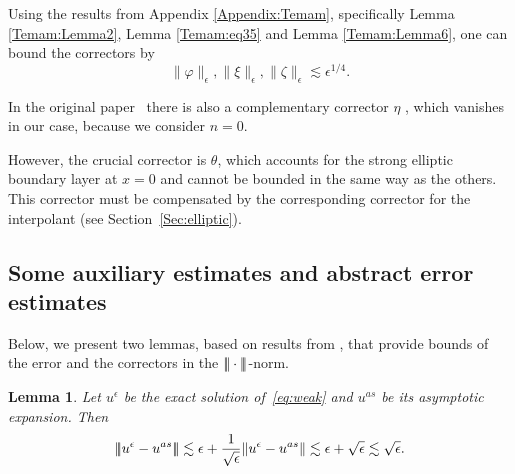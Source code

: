\documentclass{article}
\newcommand{\vvvert}{\ensuremath|\!|\!|\xspace}
\newtheorem{lemma}[thm]{Lemma}
\newcommand{\ueps}{u^\epsilon}
\newcommand{\uas}{u^{as}}
\begin{document}
Using the results from Appendix \ref{Appendix:Temam}, specifically Lemma \ref{Temam:Lemma2}, Lemma \ref{Temam:eq35} and Lemma \ref{Temam:Lemma6}, %
 one can bound the correctors by
\begin{equation}\label{Eq:correctors}
\|\varphi\|_\epsilon, \|\xi\|_\epsilon, \|\zeta\|_\epsilon \lesssim \epsilon^{1/4}.
\end{equation}

In the original paper~\cite{GieEtAl:13} there is also a complementary corrector $\eta$ \cite[Eq. 53]{GieEtAl:13}, which vanishes in our case, because we consider $n=0$.

However, the crucial corrector is $\theta$, which accounts for the strong elliptic boundary layer
at $x=0$ and cannot be bounded in the same way as the others. This corrector must be compensated by the corresponding corrector for the interpolant (see Section~\ref{Sec:elliptic}).



\subsection{Some auxiliary estimates and abstract error estimates }


Below, we present two lemmas, based on results from \cite{GieEtAl:13}, that provide bounds of the error and the correctors in the $\vvvert \cdot\vvvert $-norm. 

\begin{lemma}\label{Lemma:4}
Let $\ueps$ be the exact solution of~\eqref{eq:weak} and $\uas$ be its asymptotic expansion. Then
$$
 \vvvert  \ueps - \uas\vvvert  \lesssim \epsilon + \frac{1}{\sqrt{\epsilon}} \|\ueps - \uas\|
               \lesssim \epsilon + \sqrt{\epsilon} \lesssim \sqrt{\epsilon}.
$$
\end{lemma}
\end{document}
